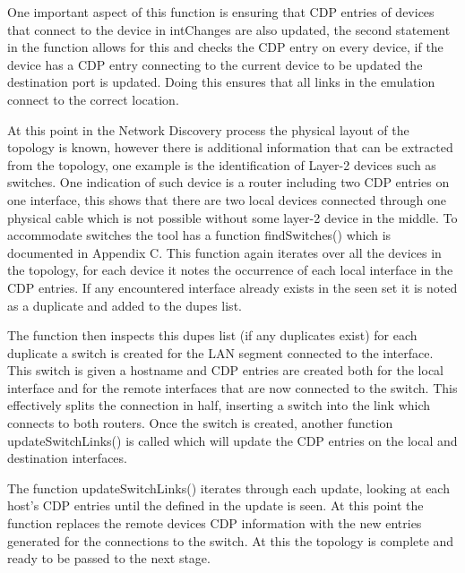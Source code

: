 \documentclass[11pt]{report}
\begin{document}
One important aspect of this function is ensuring that CDP entries of devices that connect to the device in intChanges are also updated, the second statement in the function allows for this and checks the CDP entry on every device, if the device has a CDP entry connecting to the current device to be updated the destination port is updated. Doing this ensures that all links in the emulation connect to the correct location.

At this point in the Network Discovery process the physical layout of the topology is known, however there is additional information that can be extracted from the topology, one example is the identification of Layer-2 devices such as switches. One indication of such device is a router including two CDP entries on one interface, this shows that there are two local devices connected through one physical cable which is not possible without some layer-2 device in the middle. To accommodate switches the tool has a function findSwitches() which is documented in Appendix C. This function again iterates over all the devices in the topology, for each device it notes the occurrence of each local interface in the CDP entries. If any encountered interface already exists in the seen set it is noted as a duplicate and added to the dupes list.

The function then inspects this dupes list (if any duplicates exist) for each duplicate a switch is created for the LAN segment connected to the interface. This switch is given a hostname and CDP entries are created both for the local interface and for the remote interfaces that are now connected to the switch. This effectively splits the connection in half, inserting a switch into the link which connects to both routers. Once the switch is created, another function updateSwitchLinks() is called which will update the CDP entries on the local and destination interfaces.

The function updateSwitchLinks() iterates through each update, looking at each host's CDP entries until the defined in the update is seen. At this point the function replaces the remote devices CDP information with the new entries generated for the connections to the switch. At this the topology is complete and ready to be passed to the next stage.
\end{document}
